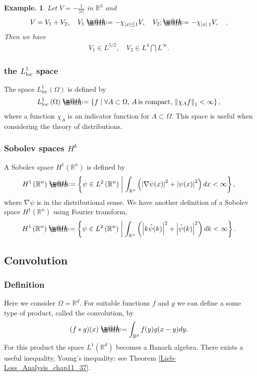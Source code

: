 \documentclass[openany, a4paper, oneside]{jsbook}
\makeatletter
\newcommand*{\defeq}{\mathrel{\rlap{%
\raisebox{0.3ex}{$\m@th\cdot$}}%
\raisebox{-0.3ex}{$\m@th\cdot$}}%
=}
\theoremstyle{break}
\theoremstyle{breakdefn}
\newtheorem{ex}[thm]{Example.}
\newcommand{\abs}[1]{\left|#1\right|}
\newcommand{\norm}[1]{\left\Vert#1\right\Vert}
\newcommand{\rbk}[1]{\left (#1\right)}
\newcommand{\relmiddle}[1]{\mathrel{}\middle#1\mathrel{}}
\newcommand{\set}[2]{\left\{#1 \relmiddle| #2\right\}}
\newcommand{\bbR}{\mathbb{R}}
\newcommand{\bbRd}{\mathbb{R}^d}
\newcommand{\bbRthree}{\mathbb{R}^3}
\newcommand{\bbRn}{\mathbb{R}^n}
\newcommand{\Loneloc}{L_{\mathrm{loc}}^1}
\newcommand{\LtwoRn}{L^2 \rbk{\bbR^n}}
\makeatother
\begin{document}
\begin{ex}
 Let $V = - \frac{1}{\abs{x}}$ in $\bbRthree$ and
 \begin{align}
  V = V_1 + V_2, \quad
  V_1
  \defeq
  -\chi_{\abs{x} \leq 1} V, \quad
  V_2;
  \defeq
  -\chi_{\abs{x} \> 1} V, \quad.
 \end{align}
 Then we have
 \begin{align}
  V_1 \in L^{5/2}, \quad
  V_2 \in L^{4} \bigcap L^{\infty}.
 \end{align}
\end{ex}
\subsubsection{the $\Loneloc$ space}


The space $\Loneloc \rbk{\Omega}$ is defined by
\begin{align}
 \Loneloc \rbk{\Omega}
 \defeq
 \set{f}{\forall A \subset \Omega, \, A \, \text{is compact}, \, \norm{\chi_A f}_1 < \infty},
\end{align}
where a function $\chi_A$ is an indicator function for $A \subset \Omega$.
This space is useful when considering the theory of distributions.
\subsubsection{Sobolev spaces $H^k$}


A Sobolev space $H^1 (\bbRn)$ is defined by
\begin{align}
 H^1 \rbk{\bbRn}
 \defeq
 \set{\psi \in \LtwoRn}{\int_{\bbRn} \rbk{\abs{\nabla \psi (x)}^2 + \abs{\psi (x)}^2} dx < \infty},
\end{align}
where $\nabla \psi$ is in the distributional sense.
We have another definition of a Sobolev space $H^1 (\bbRn)$ using Fourier transform,
\begin{align}
 H^1 \rbk{\bbRn}
 \defeq
 \set{\psi \in \LtwoRn}{\int_{\bbRn} \rbk{\abs{k \hat{\psi} (k)}^2 + \abs{\hat{\psi} (k)}^2} d k < \infty}.
\end{align}
\subsection{Convolution}

\subsubsection{Definition}


Here we consider $\Omega = \bbRd$.
For suitable functions $f$ and $g$ we can define a some type of product, called the convolution, by
\begin{align}
 (f * g) (x)
 \defeq
 \int_{\bbRd} f (y) g (x - y) dy.
\end{align}
For this product the space $L^1 (\bbRd)$ becomes a Banach algebra.
There exists a useful inequality, Young's inequality: see Theorem \ref{Lieb-Loss_Analysis_chap11_37}.
\end{document}
